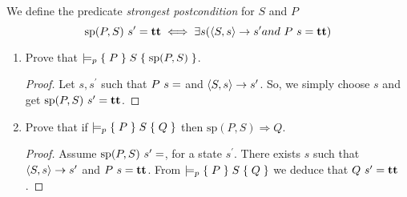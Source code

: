 We define the predicate \textit{strongest postcondition} for $S$ and $P$
\begin{equation*}
	\mathrm{sp}(P,S)\ s'=\textbf{tt}\iff\exists s(\left<S,s\right> \rightarrow s^\prime and\ P\ s=\textbf{tt})
\end{equation*}

\begin{enumerate}
\item Prove that $\models_p {\{\;P\;\}\;S\;\{\;\mathrm{sp}(P,S)\;\}}$.
\begin{proof}
	Let $s,s^\prime$ such that $P\ s=\tt$ and $\left<S,s\right> \rightarrow s^\prime$. So, we simply choose $s$ and get $\mathrm{sp}(P,S)\ s'=\true$.
\end{proof}
\item Prove that if $\models_p {\{\;P\;\}\;S\;\{\;Q\;\}}$ then $\mathrm{sp}(P,S)\Rightarrow Q$.
\begin{proof}
	Assume $\mathrm{sp}(P,S)\ s^\prime=\tt$, for a state $s^\prime$. There exists $s$ such that $\left<S,s\right> \rightarrow s^\prime$ and $P\ s=\textbf{tt}$. From $\models_p {\{\;P\;\}\;S\;\{\;Q\;\}}$ we deduce that $Q\ s^\prime=\textbf{tt}$.
\end{proof}
\end{enumerate}